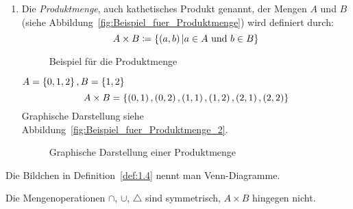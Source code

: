 \begin{definition}[Mengenoperationen]
\begin{enumerate}
\item Die \emph{Produktmenge}, auch kathetisches Produkt genannt, der Mengen $A$ und $B$ (siehe Abbildung~\vref{fig:Beispiel_fuer_Produktmenge}) wird definiert durch:
	\[A \times B \mathrel{\mathop:\!\!=} \left\{\left(a, b\right) \vert a \in A \text{ und } b \in B\right\}\]
	\begin{figure}[htb]
	\centering
	
	\caption{Beispiel für die Produktmenge}
	\label{fig:Beispiel_fuer_Produktmenge}
	\end{figure}
	\begin{example}
	$A = \left\{0, 1, 2\right\}, B = \left\{1, 2\right\}$
	\[A \times B = \left\{\left(0,1\right), \left(0,2\right), \left(1,1\right), \left(1,2\right), \left(2,1\right), \left(2,2\right)\right\}\]
	Graphische Darstellung siehe Abbildung~\vref{fig:Beispiel_fuer_Produktmenge_2}.
	\begin{figure}[htb]
	\centering
	
	\caption{Graphische Darstellung einer Produktmenge}
	\label{fig:Beispiel_fuer_Produktmenge_2}
	\end{figure}
	\end{example}
\end{enumerate}

\label{def:1.4}
\end{definition}

\begin{note}
Die Bildchen in Definition~\vref{def:1.4} nennt man Venn-Diagramme.
\end{note}

\begin{note}
Die Mengenoperationen $\cap$, $\cup$, $\triangle$ sind symmetrisch, $A \times B$ hingegen nicht.
\end{note}

